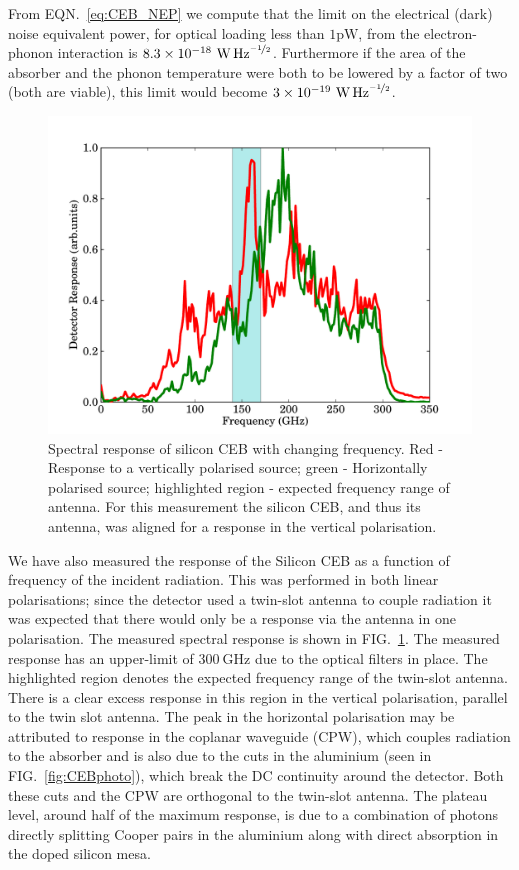 \documentclass[aip, apl, a4paper, amsmath,amssymb, reprint]{revtex4-1}
\begin{document}
From EQN.~\ref{eq:CEB_NEP} we compute that the limit on the electrical (dark) noise equivalent power, for optical loading less than $1\mathrm{pW}$, from the electron-phonon interaction is $8.3 \times 10^{-18}~\mathrm{\mbox{W\,Hz}^{\nicefrac{-1}{2}}}$. Furthermore if the area of the absorber and the phonon temperature were both to be lowered by a factor of two (both are viable), this limit would become $3 \times 10^{-19}~\mathrm{\mbox{W\,Hz}^{\nicefrac{-1}{2}}}$.
\begin{figure}[ht]
\includegraphics[width = 0.8\columnwidth]{01_FTS_response}
\caption{Spectral response of silicon CEB with changing frequency. Red - Response to a vertically polarised source; green - Horizontally polarised source; highlighted region - expected frequency range of antenna. For this measurement the silicon CEB, and thus its antenna, was aligned for a response in the vertical polarisation.}
\label{fig:FTS_response}
\end{figure}

We have also measured the response of the Silicon CEB as a function of frequency of the incident radiation. This was performed in both linear polarisations; since the detector used a twin-slot antenna to couple radiation it was expected that there would only be a response via the antenna in one polarisation. The measured spectral response is shown in FIG.~\ref{fig:FTS_response}. The measured response has an upper-limit of $300~\mathrm{GHz}$ due to the optical filters in place. The highlighted region denotes the expected frequency range of the twin-slot antenna. There is a clear excess response in this region in the vertical polarisation, parallel to the twin slot antenna. The peak in the horizontal polarisation may be attributed to response in the coplanar waveguide (CPW), which couples radiation to the absorber and is also due to the cuts in the aluminium (seen in FIG.~\ref{fig:CEBphoto}), which break the DC continuity around the detector. Both these cuts and the CPW are orthogonal to the twin-slot antenna. The plateau level, around half of the maximum response, is due to a combination of photons directly splitting Cooper pairs in the aluminium along with direct absorption in the doped silicon mesa.
\end{document}
